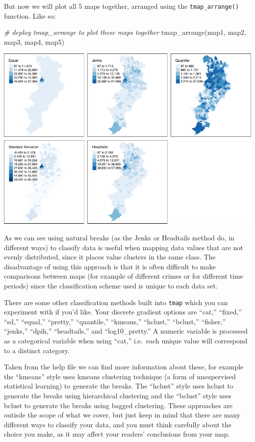 \documentclass[
  krantz2]{krantz}
\makeatletter
\newenvironment{Shaded}{\begin{snugshade}}{\end{snugshade}}
\newcommand{\CommentTok}[1]{\textcolor[rgb]{0.37,0.37,0.37}{\textit{#1}}}
\newcommand{\FunctionTok}[1]{\textcolor[rgb]{0,0,0}{#1}}
\newcommand{\NormalTok}[1]{#1}
\newenvironment{kframe}{%
\medskip{}
\setlength{\fboxsep}{.8em}
 \def\at@end@of@kframe{}%
 \ifinner\ifhmode%
  \def\at@end@of@kframe{\end{minipage}}%
  \begin{minipage}{\columnwidth}%
 \fi\fi%
 \def\FrameCommand##1{\hskip\@totalleftmargin \hskip-\fboxsep
 \colorbox{shadecolor}{##1}\hskip-\fboxsep
     \hskip-\linewidth \hskip-\@totalleftmargin \hskip\columnwidth}%
 \MakeFramed {\advance\hsize-\width
   \@totalleftmargin\z@ \linewidth\hsize
   \@setminipage}}%
 {\par\unskip\endMakeFramed%
 \at@end@of@kframe}
\renewenvironment{Shaded}{\begin{kframe}}{\end{kframe}}
\makeatother
\begin{document}
But now we will plot all 5 maps together, arranged using the \texttt{tmap\_arrange()} function. Like so:

\begin{Shaded}
\begin{Highlighting}[]
\CommentTok{\# deploy tmap\_arrange to plot these maps together}
\FunctionTok{tmap\_arrange}\NormalTok{(map1, map2, map3, map4, map5) }
\end{Highlighting}
\end{Shaded}

\includegraphics{crime_mapping_files/figure-latex/unnamed-chunk-101-1.pdf}

As we can see using natural breaks (as the Jenks or Headtails method do, in different ways) to classify data is useful when mapping data values that are not evenly distributed, since it places value clusters in the same class. The disadvantage of using this approach is that it is often difficult to make comparisons between maps (for example of different crimes or for different time periods) since the classification scheme used is unique to each data set.

There are some other classification methods built into \texttt{tmap} which you can experiment with if you'd like. Your discrete gradient options are ``cat,'' ``fixed,'' ``sd,'' ``equal,'' ``pretty,'' ``quantile,'' ``kmeans,'' ``hclust,'' ``bclust,'' ``fisher,'' ``jenks,'' ``dpih,'' ``headtails,'' and ``log10\_pretty.'' A numeric variable is processed as a categorical variable when using ``cat,'' i.e.~each unique value will correspond to a distinct category.

Taken from the help file we can find more information about these, for example the ``kmeans'' style uses kmeans clustering technique (a form of unsupervised statistical learning) to generate the breaks. The ``hclust'' style uses hclust to generate the breaks using hierarchical clustering and the ``bclust'' style uses bclust to generate the breaks using bagged clustering. These approaches are outisde the scope of what we cover, but just keep in mind that there are many different ways to classify your data, and you must think carefully about the choice you make, as it may affect your readers' conclusions from your map.
\end{document}
